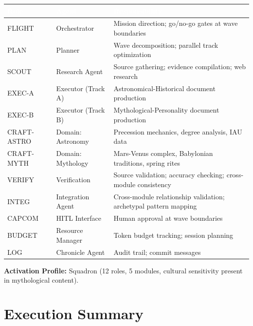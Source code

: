 \documentclass[11pt,letterpaper]{article}
\newcommand{\tableheader}[1]{\textbf{\sffamily\textcolor{white}{#1}}}
\begin{document}
\begin{center}
\begin{tabularx}{\textwidth}{L{2cm}L{3cm}X}
\toprule
{}
\tableheader{Role} & \tableheader{Agent} & \tableheader{Responsibility} \\
\midrule
FLIGHT & Orchestrator & Mission direction; go/no-go gates at wave boundaries \\
PLAN & Planner & Wave decomposition; parallel track optimization \\
SCOUT & Research Agent & Source gathering; evidence compilation; web research \\
EXEC-A & Executor (Track A) & Astronomical-Historical document production \\
EXEC-B & Executor (Track B) & Mythological-Personality document production \\
CRAFT-ASTRO & Domain: Astronomy & Precession mechanics, degree analysis, IAU data \\
CRAFT-MYTH & Domain: Mythology & Mars-Venus complex, Babylonian traditions, spring rites \\
VERIFY & Verification & Source validation; accuracy checking; cross-module consistency \\
INTEG & Integration Agent & Cross-module relationship validation; archetypal pattern mapping \\
CAPCOM & HITL Interface & Human approval at wave boundaries \\
BUDGET & Resource Manager & Token budget tracking; session planning \\
LOG & Chronicle Agent & Audit trail; commit messages \\
\bottomrule
\end{tabularx}
\end{center}

\textbf{Activation Profile:} Squadron (12 roles, 5 modules, cultural sensitivity present in mythological content).

\section{Execution Summary}
\end{document}
